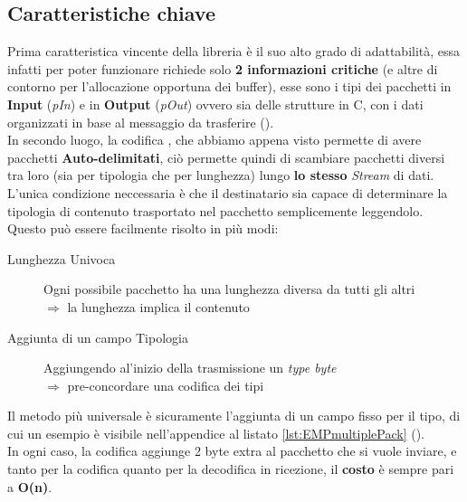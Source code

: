 \subsection{Caratteristiche chiave}
Prima caratteristica vincente della libreria è il suo alto grado di adattabilità, essa infatti per poter funzionare richiede solo \textbf{2 informazioni critiche} (e altre di contorno per l'allocazione opportuna dei buffer), esse sono i tipi dei pacchetti in \textbf{ Input} (\textit{pIn}) e in \textbf{Output} (\textit{pOut}) ovvero sia delle strutture in C, con i dati organizzati in base al messaggio da trasferire ().\\
In secondo luogo, la codifica \cite*{COBS}, che abbiamo appena visto permette di avere pacchetti \textbf{Auto-delimitati}, ciò permette quindi di scambiare pacchetti diversi tra loro (sia per tipologia che per lunghezza) lungo \textbf{lo stesso} \textit{Stream} di dati.\\
L'unica condizione neccessaria è che il destinatario sia capace di determinare la tipologia di contenuto trasportato nel pacchetto semplicemente leggendolo.\\
Questo può essere facilmente risolto in più modi:
\begin{spacing}{1.5}
	\begin{description}
		\item[Lunghezza Univoca] Ogni possibile pacchetto ha una lunghezza diversa da tutti gli altri\\
		      $\Rightarrow$ la lunghezza implica il contenuto
		\item[Aggiunta di un campo Tipologia] Aggiungendo al’inizio della trasmissione un \textit{type byte}\\
		      $\Rightarrow$ pre-concordare una codifica dei tipi
	\end{description}
\end{spacing}
\noindent
Il metodo più universale è sicuramente l'aggiunta di un campo fisso per il tipo, di cui un esempio è visibile nell'appendice al listato \ref{lst:EMPmultiplePack} ().\\
In ogni caso, la codifica \cite*{COBS} aggiunge 2 byte extra al pacchetto che si vuole inviare, e tanto per la codifica quanto per la decodifica in ricezione, il \textbf{costo} è sempre pari a \textbf{O(n)}.\vspace{-10mm}
